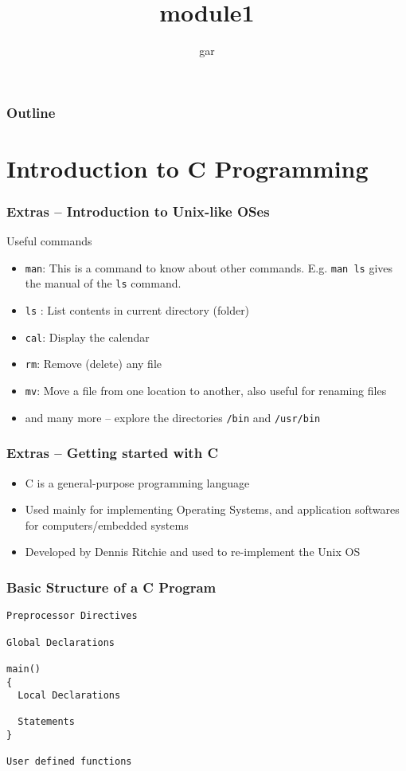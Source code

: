 \documentclass[11pt]{beamer}
\title{module1}
\author{gar}
\date{}
\begin{document}
\maketitle

\begin{frame}
\frametitle{Outline}
\setcounter{tocdepth}{3}
\tableofcontents
\end{frame}
\section{Introduction to C Programming}
\label{sec-1}
\begin{frame}[fragile]\frametitle{Extras -- Introduction to Unix-like OSes}
\label{sec-1-1}

Useful commands
\begin{itemize}
\item \verb~man~: This is a command to know about other commands. E.g. \verb~man ls~ gives the manual of the \verb~ls~ command.
\item \verb~ls~ : List contents in current directory (folder)
\item \verb~cal~: Display the calendar
\item \verb~rm~: Remove (delete) any file
\item \verb~mv~: Move a file from one location to another, also useful for renaming files
\item and many more -- explore the directories \verb~/bin~ and \verb~/usr/bin~
\end{itemize}




  
\end{frame}
\begin{frame}[fragile]\frametitle{Extras -- Getting started with C}
\label{sec-1-2}

\begin{itemize}
\item C is a general-purpose programming language
\item Used mainly for implementing Operating Systems, and application softwares for computers/embedded systems
\item Developed by Dennis Ritchie and used to re-implement the Unix OS
\end{itemize}
\end{frame}
\begin{frame}[fragile]\frametitle{Basic Structure of a C Program}
\label{sec-1-3}


\begin{verbatim}
Preprocessor Directives 

Global Declarations

main()
{
  Local Declarations

  Statements
}

User defined functions
\end{verbatim}
\end{frame}
\end{document}
